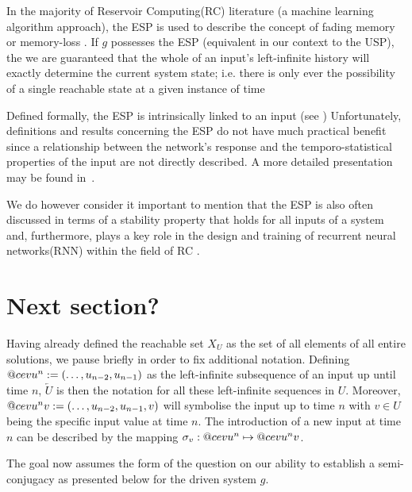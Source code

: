 \documentclass[a4paper,12pt,twoside]{report}
\makeatletter
\DeclareRobustCommand{\cev}[1]{%
  \mathpalette\do@cev{#1}%
}
\newcommand{\do@cev}[2]{%
  \fix@cev{#1}{+}%
  \reflectbox{$\m@th#1\vec{\reflectbox{$\fix@cev{#1}{-}\m@th#1#2\fix@cev{#1}{+}$}}$}%
  \fix@cev{#1}{-}%
}
\newcommand{\fix@cev}[2]{%
  \ifx#1\displaystyle
    \mkern#20mu
  \else
    \ifx#1\textstyle
      \mkern#20mu
    \else
      \ifx#1\scriptstyle
        \mkern#26mu
      \else
        \mkern#26mu
      \fi
    \fi
  \fi
}
\makeatother
\begin{document}
In the majority of Reservoir Computing(RC) literature (a machine learning algorithm approach), 
the ESP is used to describe the concept of fading memory or memory-loss  \cite{jaeger2004harnessing, lu2018attractor}. 
If $g$ possesses the ESP (equivalent in our context to the USP), the we are guaranteed that the whole of an input's left-infinite history will exactly determine the current system state; i.e. there is only ever the possibility of a single reachable state at a given instance of time \cite{jaeger2001echo}

Defined formally, the ESP is intrinsically linked to an input (see \cite{Manju_ESP}) Unfortunately, definitions and results concerning the ESP do not have much practical benefit since a relationship between the network's response and the temporo-statistical properties of the input are not directly described. A more detailed presentation may be found in~\cite{jaeger2001echo}.

We do however consider it important to mention that the ESP is also often discussed in terms of a stability property that holds for all inputs of a system~\cite{manjunath2020stability} and, furthermore, plays a key role in the design and training of recurrent neural networks(RNN) within the field of RC \cite{Manju_ESP}.
 

\section{Next section?}

Having already defined the reachable set $X_U$ as the set of all elements of all entire solutions, we pause briefly in order to fix additional notation.
Defining $\cev{u}^{n}:=(\ldots,u_{n-2} ,u_{n-1})$ as the left-infinite subsequence of an input up until time $n$, $\overleftarrow{U}$ is then the notation for all these left-infinite sequences in $U$. 
Moreover, $\cev{u}^{n}v:=(\ldots,u_{n-2} ,u_{n-1}, v)$ will symbolise the input up to time $n$ with $v \in U$ being the specific input value at time $n$. 
The introduction of a new input at time $n$ can be described by the mapping $\sigma_v:   \cev{u}^{n} \mapsto \cev{u}^{n}v$. 

The goal now assumes the form of the question on our ability to establish a semi-conjugacy as presented below for the driven system $g$. 
\end{document}
